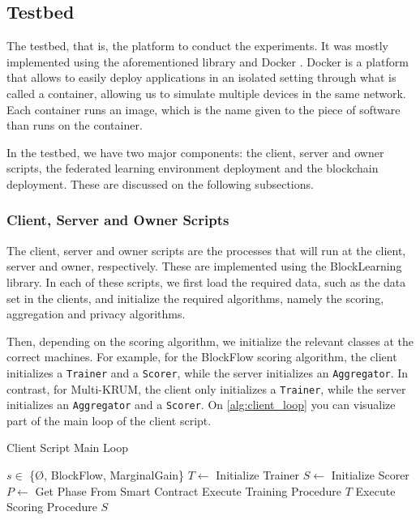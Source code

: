 \subsection{Testbed}

The testbed, that is, the platform to conduct the experiments. It was mostly implemented using the aforementioned library and Docker \cite{docker}. Docker is a platform that allows to easily deploy applications in an isolated setting through what is called a container, allowing us to simulate multiple devices in the same network. Each container runs an image, which is the name given to the piece of software than runs on the container.

In the testbed, we have two major components: the client, server and owner scripts, the federated learning environment deployment and the blockchain deployment. These are discussed on the following subsections.

\subsubsection{Client, Server and Owner Scripts}

The client, server and owner scripts are the processes that will run at the client, server and owner, respectively. These are implemented using the BlockLearning library. In each of these scripts, we first load the required data, such as the data set in the clients, and initialize the required algorithms, namely the scoring, aggregation and privacy algorithms.

Then, depending on the scoring algorithm, we initialize the relevant classes at the correct machines. For example, for the BlockFlow scoring algorithm, the client initializes a \texttt{Trainer} and a \texttt{Scorer}, while the server initializes an \texttt{Aggregator}. In contrast, for Multi-KRUM, the client only initializes a \texttt{Trainer}, while the server initializes an \texttt{Aggregator} and a \texttt{Scorer}. On \autoref{alg:client_loop} you can visualize part of the main loop of the client script.

\begin{algorithm}
\caption{Client Script Main Loop}\label{alg:client_loop}
\begin{algorithmic}
\Require $s \in$ \{\O, BlockFlow, MarginalGain\}
\State $T \gets $ Initialize Trainer
    \State $S \gets $ Initialize Scorer
\EndIf
{}
    \State $P \gets$ Get Phase From Smart Contract
        \State Execute Training Procedure $T$
        \State Execute Scoring Procedure $S$
    \EndIf
\EndWhile
\end{algorithmic}
\end{algorithm}

